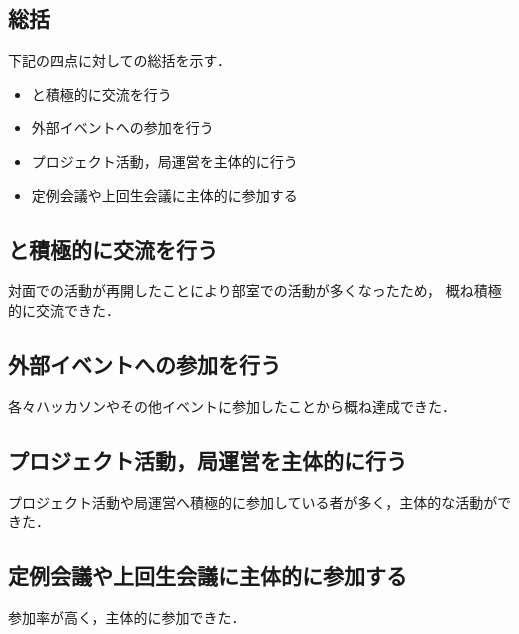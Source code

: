\subsection*{\secondGrade{}総括}


下記の四点に対しての総括を示す．
\begin{itemize}
    \item \firstGrade{}と積極的に交流を行う
    \item 外部イベントへの参加を行う
    \item プロジェクト活動，局運営を主体的に行う
    \item 定例会議や上回生会議に主体的に参加する
\end{itemize}

\subsection*{\firstGrade{}と積極的に交流を行う}
対面での活動が再開したことにより部室での活動が多くなったため，
概ね積極的に交流できた．

\subsection*{外部イベントへの参加を行う}
各々ハッカソンやその他イベントに参加したことから概ね達成できた．

\subsection*{プロジェクト活動，局運営を主体的に行う}
プロジェクト活動や局運営へ積極的に参加している者が多く，主体的な活動ができた．

\subsection*{定例会議や上回生会議に主体的に参加する}
参加率が高く，主体的に参加できた．
